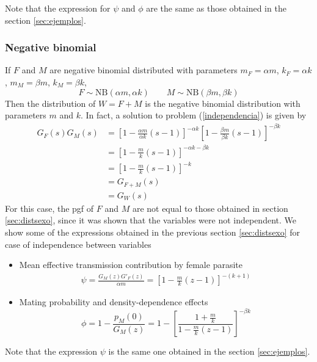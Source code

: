 \documentclass[bimj,fleqn]{w-art}
\theoremstyle{plain}
\theoremstyle{definition}
\begin{document}
Note that the expression for $\psi$ and $\phi$ are the same as those obtained in the section \ref{sec:ejemplos}.

\subsubsection{Negative binomial}

If $F$ and $M$ are negative binomial distributed with parameters $m_F=\alpha m$, $k_F=\alpha k$, $m_M=\beta m$, $k_M=\beta k$, 
\begin{equation*}
F\sim \mathrm{NB}(\alpha m,\alpha k) \qquad M\sim \mathrm{NB}(\beta m,\beta k)
\end{equation*}  
Then the distribution of $W=F+M$ is the negative binomial distribution with parameters $m$ and $k$. In fact,  a solution to problem (\ref{independencia}) is given by
\begin{align*}
G_F(s)G_M(s)&=\left[ 1-\frac{\alpha m}{\alpha k}(s-1)\right] ^{-\alpha k} \left[ 1-\frac{\beta m}{\beta k}(s-1)\right] ^{-\beta k}\\
&=\left[ 1-\frac{m}{k}(s-1)\right] ^{-\alpha k-\beta k}\\
&=\left[ 1- \frac{m}{k}(s-1) \right] ^{-k}\\
&=G_{F+M}(s)\\
&=G_W(s)
\end{align*}
For this case, the pgf of $F$ and $M$ are not equal to those obtained in section \ref{sec:distsexo}, since it was shown that the variables were not independent. We show some of the expressions obtained in the previous section \ref{sec:distsexo} for case of independence between variables 
\begin{itemize}
	\item Mean effective transmission contribution by female parasite
	\begin{align}
	\psi=\frac{G_M(z)G'_F(z)}{\alpha m}=\left[ 1-\frac{m}{k}(z-1)\right] ^{-(k+1)}
	\end{align}
	
	\item Mating probability and density-dependence effects
	\begin{equation}
	\phi= 1-\frac{p_M(0)}{G_M(z)}=1-\left[ \frac{1+\frac{m}{k}}{1-\frac{m}{k}(z-1)}\right]^{-\beta k} 
	\end{equation}
\end{itemize}
Note that the expression $\psi$ is the same one obtained in the section \ref{sec:ejemplos}.
\end{document}
